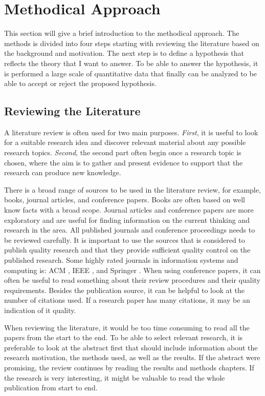 	\clearpage
	\section{Methodical Approach} \label{sec:researchmethods}

		This section will give a brief introduction to the methodical approach. The methods is divided into four steps starting with reviewing the literature based on the background and motivation. The next step is to define a hypothesis that reflects the theory that I want to answer. To be able to answer the hypothesis, it is performed a large scale of quantitative data that finally can be analyzed to be able to accept or reject the proposed hypothesis. 

		\subsection{Reviewing the Literature}\label{sec:methodliteraturereview}

	    A literature review is often used for two main purposes. {\it First}, it is useful to look for a suitable research idea and discover relevant material about any possible research topics. {\it Second}, the second part often begin once a research topic is chosen, where the aim is to gather and present evidence to support that the research can produce new knowledge.

	    There is a broad range of sources to be used in the literature review, for example, books, journal articles, and conference papers. Books are often based on well know facts with a broad scope. Journal articles and conference papers are more exploratory and are useful for finding information on the current thinking and research in the area. All published journals and conference proceedings needs to be reviewed carefully. It is important to use the sources that is considered to publish quality research and that they provide sufficient quality control on the published research. Some highly rated journals in information systems and computing is: ACM \cite{ACM}, IEEE \cite{IEEE}, and Springer \cite{Springer}. When using conference papers, it can often be useful to read something about their review procedures and their quality requirements. Besides the publication source, it can be helpful to look at the number of citations used. If a research paper has many citations, it may be an indication of it quality.

	    When reviewing the literature, it would be too time consuming to read all the papers from the start to the end. To be able to select relevant research, it is preferable to look at the abstract first that should include information about the research motivation, the methods used, as well as the results. If the abstract were promising, the review continues by reading the results and methods chapters. If the research is very interesting, it might be valuable to read the whole publication from start to end.

